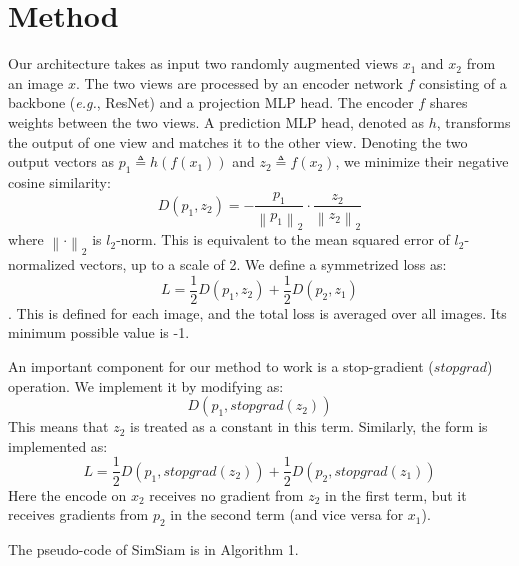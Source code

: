 \documentclass[conference]{IEEEtran}
\begin{document}
\section{Method}
Our architecture takes as input two randomly augmented views $x_1$ and $x_2$ from an image $x$. 
The two views are processed by an encoder network $f$ consisting of a backbone (\textit{e.g.}, ResNet) and a projection MLP head.
The encoder $f$ shares weights between the two views. A prediction MLP head, denoted as $h$, transforms the output of one view and matches it to the other view.
Denoting the two output vectors as $p_1 \triangleq h(f(x_1))$ and $z_2 \triangleq f(x_2)$, we minimize their negative cosine similarity:
\begin{equation}
    D(p_1, z_2) = - \frac{p_1}{\left\lVert p_1 \right\rVert_2} \cdot \frac{z_2}{\left\lVert z_2\right\rVert_2}
\end{equation}
where $\left\lVert \cdot \right\rVert_2$ is $l_2$-norm. This is equivalent to the mean squared error of $l_2$-normalized vectors, up to a scale of 2.
We define a symmetrized loss as:
\begin{equation}
    L = \frac{1}{2} D(p_1, z_2) + \frac{1}{2} D(p_2, z_1)
\end{equation}. This is defined for each image, and the total loss is averaged over all images.
Its minimum possible value is -1. 

An important component for our method to work is a stop-gradient ($stopgrad$) operation. We implement it by modifying as:
\begin{equation}
    D(p_1, stopgrad(z_2))
\end{equation}
This means that $z_2$ is treated as a constant in this term. Similarly, the form is implemented as:
\begin{equation}
    L = \frac{1}{2}D(p_1, stopgrad(z_2)) + \frac{1}{2}D(p_2, stopgrad(z_1))
\end{equation}
Here the encode on $x_2$ receives no gradient from $z_2$ in the first term, but it receives gradients from $p_2$ in the second term (and vice versa for $x_1$).

The pseudo-code of SimSiam is in Algorithm 1.
\end{document}
